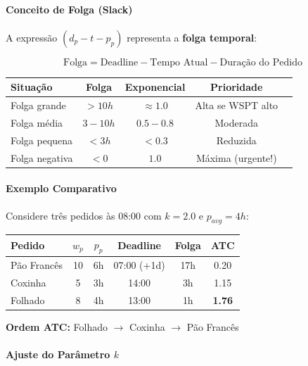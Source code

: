 \documentclass[11pt,a4paper]{article}
\begin{document}
\paragraph{Conceito de Folga (Slack)}

A expressão $(d_p - t - p_p)$ representa a \textbf{folga temporal}:

\begin{equation}
\text{Folga} = \text{Deadline} - \text{Tempo Atual} - \text{Duração do Pedido}
\end{equation}

\begin{center}
\begin{tabular}{lcccc}
\toprule
\textbf{Situação} & \textbf{Folga} & \textbf{Exponencial} & \textbf{Prioridade} \\
\midrule
Folga grande & $> 10h$ & $\approx 1.0$ & Alta se WSPT alto \\
Folga média & $3-10h$ & $0.5-0.8$ & Moderada \\
Folga pequena & $< 3h$ & $< 0.3$ & Reduzida \\
Folga negativa & $< 0$ & $1.0$ & Máxima (urgente!) \\
\bottomrule
\end{tabular}
\end{center}

\paragraph{Exemplo Comparativo}

Considere três pedidos às 08:00 com $k=2.0$ e $p_{avg}=4h$:

\begin{center}
\begin{tabular}{lccccc}
\toprule
\textbf{Pedido} & \textbf{$w_p$} & \textbf{$p_p$} & \textbf{Deadline} & \textbf{Folga} & \textbf{ATC} \\
\midrule
Pão Francês & 10 & 6h & 07:00 (+1d) & 17h & 0.20 \\
Coxinha & 5 & 3h & 14:00 & 3h & 1.15 \\
Folhado & 8 & 4h & 13:00 & 1h & \textbf{1.76} \\
\bottomrule
\end{tabular}
\end{center}

\textbf{Ordem ATC:} Folhado $\rightarrow$ Coxinha $\rightarrow$ Pão Francês

\paragraph{Ajuste do Parâmetro $k$}
\end{document}
